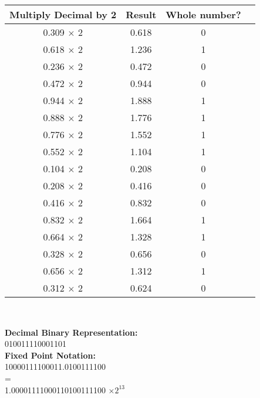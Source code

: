 \documentclass[12pt]{article}
\begin{document}
\begin{center}
		\begin{tabular}{ |c|c|c|c| } 
			\hline
			\textbf{Multiply Decimal by 2} & \textbf{Result} & \textbf{Whole number?}  \\
			\hline
			0.309 $\times$ 2  & 0.618 &  0 \\ 
			\hline
			0.618  $\times$ 2  & 1.236  &  1 \\
			\hline
			0.236   $\times$ 2  & 0.472   &  0 \\ 
			\hline
			0.472    $\times$ 2  & 0.944    &  0 \\ 
			\hline
			0.944     $\times$ 2  & 1.888    &  1 \\ 
			\hline
			0.888     $\times$ 2  & 1.776    &  1 \\ 
			\hline
			0.776     $\times$ 2  & 1.552    &  1 \\ 
			\hline
			0.552     $\times$ 2  & 1.104    &  1 \\ 
			\hline
			0.104     $\times$ 2  & 0.208    &  0 \\ 
			\hline
			0.208     $\times$ 2  & 0.416   &  0 \\ 
			\hline
			0.416     $\times$ 2  & 0.832    &  0 \\ 
			\hline
			0.832     $\times$ 2  & 1.664    &  1 \\ 
			\hline
			0.664     $\times$ 2  & 1.328    &  1 \\ 
			\hline
			0.328     $\times$ 2  & 0.656   &  0 \\ 
			\hline
			0.656     $\times$ 2  & 1.312    &  1 \\ 
			\hline
			0.312     $\times$ 2  & 0.624    &  0 \\ 
			\hline
		\end{tabular} \vspace{0.6cm} \\
		
		\newpage
		
		
		\textbf{Decimal Binary Representation:} \\
		010011110001101 \vspace{1cm} \\
		
		\textbf{Fixed Point Notation:} \\
		10000111100011.0100111100 \vspace{0.2cm} \\
		
		= \vspace{0.2cm}\\
		
		1.00001111000110100111100 $\times 2^{13}$ \vspace{0.5cm} \\
		
		
	\end{center}
	
\end{document}
